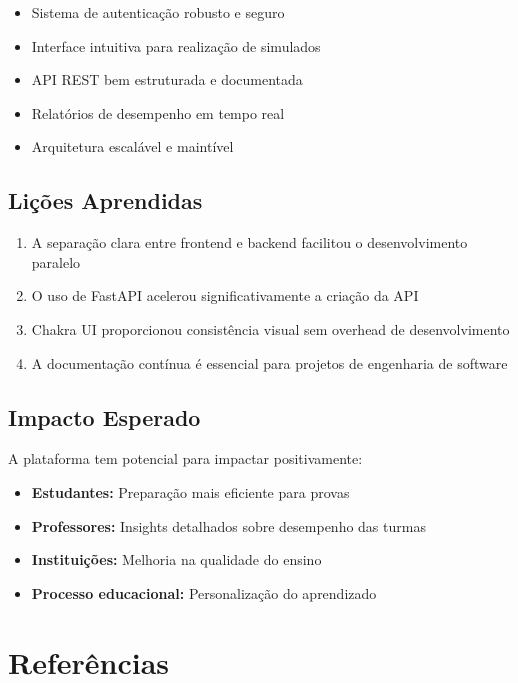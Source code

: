 \documentclass[12pt,a4paper]{article}
\begin{document}
\begin{itemize}
    \item Sistema de autenticação robusto e seguro
    \item Interface intuitiva para realização de simulados
    \item API REST bem estruturada e documentada
    \item Relatórios de desempenho em tempo real
    \item Arquitetura escalável e maintível
\end{itemize}

\subsection{Lições Aprendidas}
\begin{enumerate}
    \item A separação clara entre frontend e backend facilitou o desenvolvimento paralelo
    \item O uso de FastAPI acelerou significativamente a criação da API
    \item Chakra UI proporcionou consistência visual sem overhead de desenvolvimento
    \item A documentação contínua é essencial para projetos de engenharia de software
\end{enumerate}

\subsection{Impacto Esperado}
A plataforma tem potencial para impactar positivamente:
\begin{itemize}
    \item \textbf{Estudantes:} Preparação mais eficiente para provas
    \item \textbf{Professores:} Insights detalhados sobre desempenho das turmas
    \item \textbf{Instituições:} Melhoria na qualidade do ensino
    \item \textbf{Processo educacional:} Personalização do aprendizado
\end{itemize}

\section{Referências}
\end{document}

